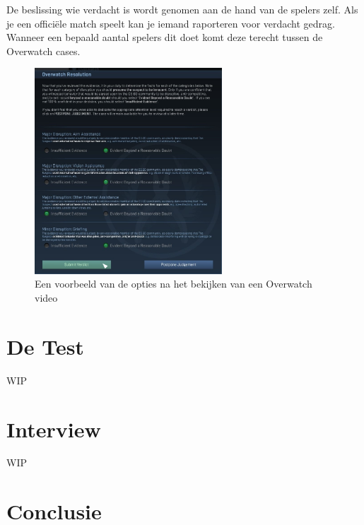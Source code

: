 \documentclass[pdftex,a4paper,12pt,twoside]{report}
\begin{document}
De beslissing wie verdacht is wordt genomen aan de hand van de spelers zelf. Als je een officiële match speelt kan je iemand raporteren voor verdacht gedrag. Wanneer een bepaald aantal spelers dit doet komt deze terecht tussen de Overwatch cases.

\begin{figure}
\centering
\includegraphics[width=7cm]{img/overwatch-example}
\caption{Een voorbeeld van de opties na het bekijken van een Overwatch video}
\end{figure}


\chapter{De Test}
\label{ch:test}

WIP

\chapter{Interview}
\label{ch:interview}
WIP


\chapter{Conclusie}
\label{ch:conclusie}








\listoffigures
\listoftables
\end{document}
